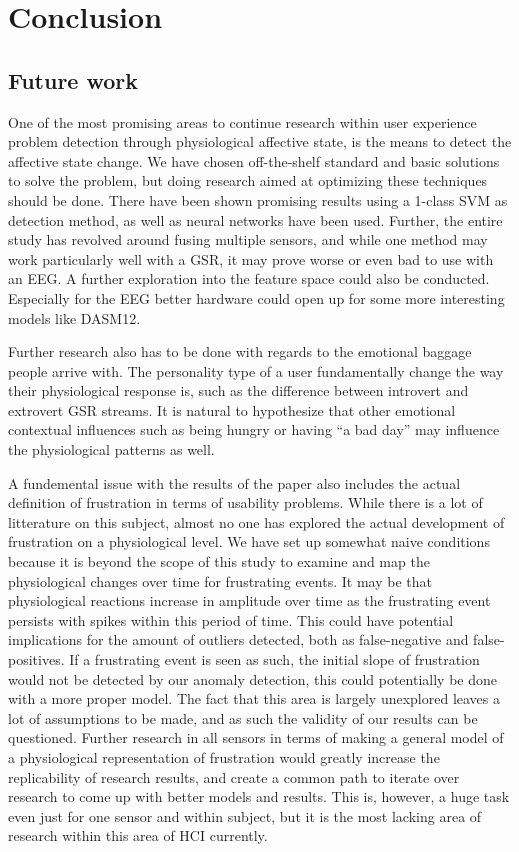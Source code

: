 
\section{Conclusion}

\subsection{Future work}
One of the most promising areas to continue research within user experience problem detection through physiological affective state, is the means to detect the affective state change. 
We have chosen off-the-shelf standard and basic solutions to solve the problem, but doing research aimed at optimizing these techniques should be done. 
There have been shown promising results using a 1-class SVM as detection method, as well as neural networks have been used.
Further, the entire study has revolved around fusing multiple sensors, and while one method may work particularly well with a GSR, it may prove worse or even bad to use with an EEG. 
A further exploration into the feature space could also be conducted. 
Especially for the EEG better hardware could open up for some more interesting models like DASM12\cite{eeg_music_listening}. 

Further research also has to be done with regards to the emotional baggage people arrive with. 
The personality type of a user fundamentally change the way their physiological response is, such as the difference between introvert and extrovert GSR streams. 
It is natural to hypothesize that other emotional contextual influences such as being hungry or having ``a bad day'' may influence the physiological patterns as well. 

A fundemental issue with the results of the paper also includes the actual definition of frustration in terms of usability problems. 
While there is a lot of litterature on this subject, almost no one has explored the actual development of frustration on a physiological level. 
We have set up somewhat naive conditions because it is beyond the scope of this study to examine and map the physiological changes over time for frustrating events. 
It may be that physiological reactions increase in amplitude over time as the frustrating event persists with spikes within this period of time. This could have potential implications for the amount of outliers detected, both as false-negative and false-positives. If a frustrating event is seen as such, the initial slope of frustration would not be detected by our anomaly detection, this could potentially be done with a more proper model. 
The fact that this area is largely unexplored leaves a lot of assumptions to be made, and as such the validity of our results can be questioned. 
Further research in all sensors in terms of making a general model of a physiological representation of frustration would greatly increase the replicability of research results, and create a common path to iterate over research to come up with better models and results. 
This is, however, a huge task even just for one sensor and within subject, but it is the most lacking area of research within this area of HCI currently.
